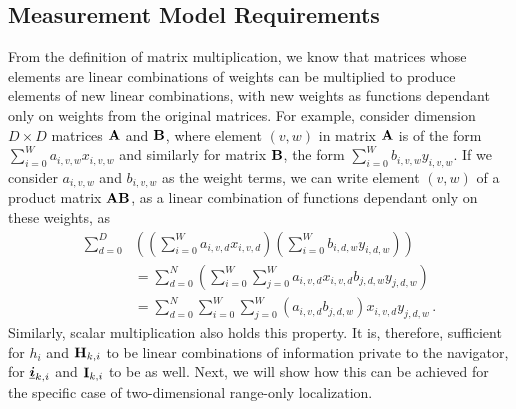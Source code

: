 \documentclass[10pt,letterpaper,oneside,twocolumn,journal]{IEEEtran}
\theoremstyle{definition}
\theoremstyle{definition}
\theoremstyle{remark}
\begin{document}
% 
% 

\subsection{Measurement Model Requirements}
From the definition of matrix multiplication, we know that matrices whose elements are linear combinations of weights can be multiplied to produce elements of new linear combinations, with new weights as functions dependant only on weights from the original matrices. For example, consider dimension $D\times D$ matrices ${{\mathbf{A}}}$ and ${{\mathbf{B}}}$, where element $(v,w)$ in matrix ${{\mathbf{A}}}$ is of the form $\sum_{i=0}^W a_{i,v,w}x_{i,v,w}$ and similarly for matrix ${{\mathbf{B}}}$, the form $\sum_{i=0}^W b_{i,v,w}y_{i,v,w}$. If we consider $a_{i,v,w}$ and $b_{i,v,w}$ as the weight terms, we can write element $(v,w)$ of a product matrix ${{\mathbf{A}}}{{\mathbf{B}}}$, as a linear combination of functions dependant only on these weights, as
\begin{equation}
    \begin{split}
        \sum_{d=0}^D&\left(\left(\sum_{i=0}^W a_{i,v,d}x_{i,v,d}\right)\left(\sum_{i=0}^W b_{i,d,w}y_{i,d,w}\right)\right) \\
        &=\sum_{d=0}^N\left(\sum_{i=0}^W\sum_{j=0}^W a_{i,v,d}x_{i,v,d}b_{j,d,w}y_{j,d,w}\right) \\
        &=\sum_{d=0}^N\sum_{i=0}^W\sum_{j=0}^W (a_{i,v,d}b_{j,d,w})x_{i,v,d}y_{j,d,w}\,.
    \end{split} \label{eqn:matrix_mult_weights}
\end{equation}
Similarly, scalar multiplication also holds this property. It is, therefore, sufficient for $h_i$ and ${{\mathbf{H}}}_{k,i}$ to be linear combinations of information private to the navigator, for ${\boldsymbol{\underline{i}}}_{k,i}$ and ${{\mathbf{I}}}_{k,i}$ to be as well. Next, we will show how this can be achieved for the specific case of two-dimensional range-only localization.

% 
% 
\end{document}
